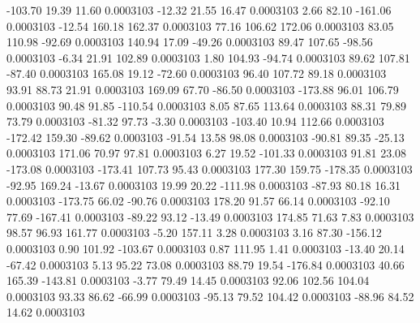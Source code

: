      -103.70       19.39       11.60     0.0003103
      -12.32       21.55       16.47     0.0003103
        2.66       82.10     -161.06     0.0003103
      -12.54      160.18      162.37     0.0003103
       77.16      106.62      172.06     0.0003103
       83.05      110.98      -92.69     0.0003103
      140.94       17.09      -49.26     0.0003103
       89.47      107.65      -98.56     0.0003103
       -6.34       21.91      102.89     0.0003103
        1.80      104.93      -94.74     0.0003103
       89.62      107.81      -87.40     0.0003103
      165.08       19.12      -72.60     0.0003103
       96.40      107.72       89.18     0.0003103
       93.91       88.73       21.91     0.0003103
      169.09       67.70      -86.50     0.0003103
     -173.88       96.01      106.79     0.0003103
       90.48       91.85     -110.54     0.0003103
        8.05       87.65      113.64     0.0003103
       88.31       79.89       73.79     0.0003103
      -81.32       97.73       -3.30     0.0003103
     -103.40       10.94      112.66     0.0003103
     -172.42      159.30      -89.62     0.0003103
      -91.54       13.58       98.08     0.0003103
      -90.81       89.35      -25.13     0.0003103
      171.06       70.97       97.81     0.0003103
        6.27       19.52     -101.33     0.0003103
       91.81       23.08     -173.08     0.0003103
     -173.41      107.73       95.43     0.0003103
      177.30      159.75     -178.35     0.0003103
      -92.95      169.24      -13.67     0.0003103
       19.99       20.22     -111.98     0.0003103
      -87.93       80.18       16.31     0.0003103
     -173.75       66.02      -90.76     0.0003103
      178.20       91.57       66.14     0.0003103
      -92.10       77.69     -167.41     0.0003103
      -89.22       93.12      -13.49     0.0003103
      174.85       71.63        7.83     0.0003103
       98.57       96.93      161.77     0.0003103
       -5.20      157.11        3.28     0.0003103
        3.16       87.30     -156.12     0.0003103
        0.90      101.92     -103.67     0.0003103
        0.87      111.95        1.41     0.0003103
      -13.40       20.14      -67.42     0.0003103
        5.13       95.22       73.08     0.0003103
       88.79       19.54     -176.84     0.0003103
       40.66      165.39     -143.81     0.0003103
       -3.77       79.49       14.45     0.0003103
       92.06      102.56      104.04     0.0003103
       93.33       86.62      -66.99     0.0003103
      -95.13       79.52      104.42     0.0003103
      -88.96       84.52       14.62     0.0003103
